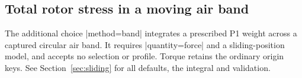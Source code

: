 \subsection{Total rotor stress in a moving air band}
The additional choice |method=band| integrates a prescribed P1 weight across a
captured circular air band. It requires |quantity=force| and a sliding-position
model, and accepts no selection or profile. Torque retains the ordinary origin
keys. See Section~\ref{sec:sliding} for all defaults, the integral and validation.
